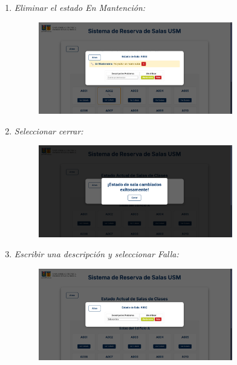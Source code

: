 \documentclass{article}
\begin{document}
\begin{enumerate}
\begin{enumerate}
            
            \item \textit{Eliminar el estado En Mantención:}
            \begin{figure}[H] 
                \centering 
                \includegraphics[width=0.8\textwidth]{IMG/ss25.png} 
            \end{figure}

            \newpage
            \item  \textit{Seleccionar cerrar:}
            \begin{figure}[H] 
                \centering 
                \includegraphics[width=0.8\textwidth]{IMG/ss26.png} 
            \end{figure}
            
            
            \item \textit{Escribir una descripción y seleccionar Falla: }
            \begin{figure}[H] 
                \centering 
                \includegraphics[width=0.8\textwidth]{IMG/ss27.png}
            \end{figure}
            


\end{enumerate}
\end{enumerate}
\end{document}
